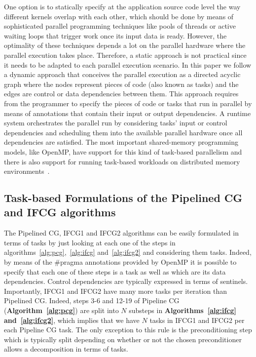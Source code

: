 One option is to statically specify at the application source code level the way different kernels overlap with each other, which should be done by means of sophisticated parallel programming techniques like pools of threads or active waiting loops that trigger work once its input data is ready.
However, the optimality of these techniques depends a lot on the parallel hardware where the parallel execution takes place.
Therefore, a static approach is not practical since it needs to be adapted to each parallel execution scenario.
In this paper we follow a dynamic approach that conceives the parallel execution as a directed acyclic graph where the nodes represent pieces of code (also known as tasks) and the edges are control or data dependencies between them.
This approach requires from the programmer to specify the pieces of code or tasks that run in parallel by means of annotations that contain their input or output dependencies.
A runtime system orchestrates the parallel run by considering tasks' input or control dependencies and scheduling them into the available parallel hardware once all dependencies are satisfied.
The most important shared-memory programming models, like OpenMP, have support for this kind of task-based parallelism
and there is also support for running task-based workloads on distributed memory environments~\cite{Bueno13}. 

\subsection{Task-based Formulations of the Pipelined CG and IFCG algorithms} 
\label{sec:ifcg_task}

The Pipelined CG, IFCG1 and IFCG2 algorithms can be easily formulated in terms of tasks by just looking at each one of the steps in algorithms~\ref{alg:pcg},~\ref{alg:ifcg} and~\ref{alg:ifcg2} and considering them tasks. 
Indeed, by means of the \#pragma annotations provided by OpenMP it is possible to specify that each one of these steps is a task as well as which are its data dependencies.
Control dependencies are typically expressed in terms of sentinels.
Importantly, IFCG1 and IFCG2 have many more tasks per iteration than Pipelined CG.
Indeed, steps 3-6 and 12-19 of Pipeline CG ({\bf Algorithm~\ref{alg:pcg}}) 
are split into $N$ substeps in {\bf Algorithms~\ref{alg:ifcg} and~\ref{alg:ifcg2}}, which implies that we have $N$ tasks in IFCG1 and IFCG2 per each Pipeline CG task.  
The only exception to this rule is the preconditioning step which is typically split depending on whether or not the chosen preconditioner allows a decomposition in terms of tasks.

